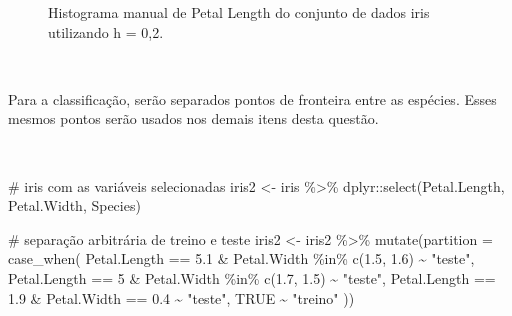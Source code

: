 \documentclass[
  a4paperpaper,
]{article}
\newenvironment{Shaded}{\begin{snugshade}}{\end{snugshade}}
\newcommand{\AttributeTok}[1]{\textcolor[rgb]{0.40,0.45,0.13}{#1}}
\newcommand{\CommentTok}[1]{\textcolor[rgb]{0.37,0.37,0.37}{#1}}
\newcommand{\ConstantTok}[1]{\textcolor[rgb]{0.56,0.35,0.01}{#1}}
\newcommand{\DecValTok}[1]{\textcolor[rgb]{0.68,0.00,0.00}{#1}}
\newcommand{\FloatTok}[1]{\textcolor[rgb]{0.68,0.00,0.00}{#1}}
\newcommand{\FunctionTok}[1]{\textcolor[rgb]{0.28,0.35,0.67}{#1}}
\newcommand{\NormalTok}[1]{\textcolor[rgb]{0.00,0.23,0.31}{#1}}
\newcommand{\OtherTok}[1]{\textcolor[rgb]{0.00,0.23,0.31}{#1}}
\newcommand{\SpecialCharTok}[1]{\textcolor[rgb]{0.37,0.37,0.37}{#1}}
\newcommand{\StringTok}[1]{\textcolor[rgb]{0.13,0.47,0.30}{#1}}
\begin{document}
\begin{figure}[H]


\caption{\label{fig-histogramairis2}Histograma manual de Petal Length do
conjunto de dados iris utilizando h = 0,2.}

\end{figure}%

~

Para a classificação, serão separados pontos de fronteira entre as
espécies. Esses mesmos pontos serão usados nos demais itens desta
questão.

~

\begin{Shaded}
\begin{Highlighting}[]
\CommentTok{\# iris com as variáveis selecionadas}
\NormalTok{iris2 }\OtherTok{\textless{}{-}}\NormalTok{ iris }\SpecialCharTok{\%\textgreater{}\%}\NormalTok{ dplyr}\SpecialCharTok{::}\FunctionTok{select}\NormalTok{(Petal.Length, Petal.Width, Species)}

\CommentTok{\# separação arbitrária de treino e teste}
\NormalTok{iris2 }\OtherTok{\textless{}{-}}\NormalTok{ iris2 }\SpecialCharTok{\%\textgreater{}\%}
  \FunctionTok{mutate}\NormalTok{(}\AttributeTok{partition =} \FunctionTok{case\_when}\NormalTok{(}
\NormalTok{    Petal.Length }\SpecialCharTok{==} \FloatTok{5.1} \SpecialCharTok{\&}\NormalTok{ Petal.Width }\SpecialCharTok{\%in\%} \FunctionTok{c}\NormalTok{(}\FloatTok{1.5}\NormalTok{, }\FloatTok{1.6}\NormalTok{) }\SpecialCharTok{\textasciitilde{}} \StringTok{"teste"}\NormalTok{,}
\NormalTok{    Petal.Length }\SpecialCharTok{==} \DecValTok{5} \SpecialCharTok{\&}\NormalTok{ Petal.Width }\SpecialCharTok{\%in\%} \FunctionTok{c}\NormalTok{(}\FloatTok{1.7}\NormalTok{, }\FloatTok{1.5}\NormalTok{) }\SpecialCharTok{\textasciitilde{}} \StringTok{"teste"}\NormalTok{,}
\NormalTok{    Petal.Length }\SpecialCharTok{==} \FloatTok{1.9} \SpecialCharTok{\&}\NormalTok{ Petal.Width }\SpecialCharTok{==} \FloatTok{0.4} \SpecialCharTok{\textasciitilde{}} \StringTok{"teste"}\NormalTok{,}
    \ConstantTok{TRUE} \SpecialCharTok{\textasciitilde{}} \StringTok{"treino"}
\NormalTok{  ))}
\end{Highlighting}
\end{Shaded}
\end{document}
